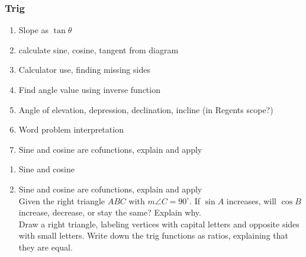 \documentclass[12pt, twoside]{article}
\begin{document}
\subsubsection*{Trig}
  \begin{enumerate}
    \item Slope as $\tan \theta$
    \item calculate sine, cosine, tangent from diagram
    \item Calculator use, finding missing sides
    \item Find angle value using inverse function
    \item Angle of elevation, depression, declination, incline (in Regents scope?)
    \item Word problem interpretation
    \item Sine and cosine are cofunctions, explain and apply
  \end{enumerate}

  \begin{enumerate}
    \subsubsection*{Diagrams}
    \item Sine and cosine

  \item Sine and cosine are cofunctions, explain and apply\\
  Given the right triangle $ABC$ with $m\angle C=90^\circ$. If $\sin A$ increases, will $\cos B$ increase, decrease, or stay the same? Explain why.\\
  Draw a right triangle, labeling vertices with capital letters and opposite sides with small letters. Write down the trig functions as ratios, explaining that they are equal.
  \end{enumerate}

\newpage
\end{document}
